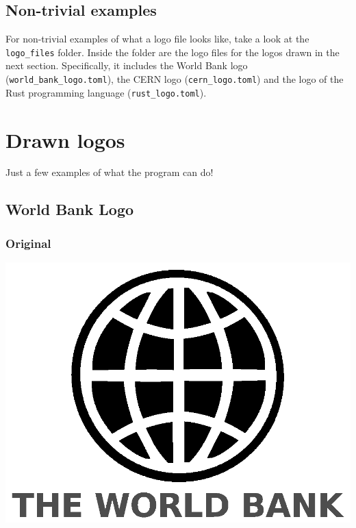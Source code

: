 \documentclass[11pt]{article}
\begin{document}
\subsection{Non-trivial examples}
\label{sec:org2ccd863}
For non-trivial examples of what a logo file looks like, take a look at the \texttt{logo\_files} folder. Inside the folder are the logo files for the logos drawn in the next section. Specifically, it includes the World Bank logo (\texttt{world\_bank\_logo.toml}), the CERN logo (\texttt{cern\_logo.toml}) and the logo of the Rust programming language (\texttt{rust\_logo.toml}).

 \newpage

\section{Drawn logos}
\label{sec:orgcab13dc}
Just a few examples of what the program can do!

\subsection{World Bank Logo}
\label{sec:org003fa08}

\subsubsection{Original}
\label{sec:orgcff5bee}
\begin{center}
\includegraphics[width=.9\linewidth]{./images/world_bank_logo.png}
\end{center}
\end{document}
